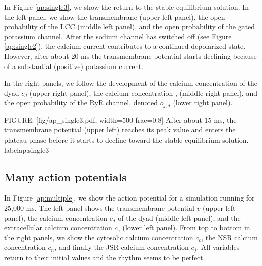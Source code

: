 In Figure \ref{ap:single3}, we show the return to the stable equilibrium solution. In the left panel, we show the transmembrane (upper left panel), the open probability of the LCC (middle left panel), and the open probability of the gated potassium channel. After the sodium channel has switched off (see Figure \ref{ap:single2}), the calcium current contributes to a continued depolarized state. However, after about 20 ms the transmembrane potential starts declining because of a substantial (positive) potassium current.

In the right panels, we follow the development of the calcium concentration of the dyad $c_d$ (upper right panel),  the calcium concentration
,
(middle right panel), and the open probability of the RyR channel, denoted $o_{j,d}$ (lower right panel).

FIGURE: [fig/ap_single3.pdf, width=500 frac=0.8] After about 15 ms, the transmembrane potential (upper left) reaches its peak value and enters the plateau phase before it starts to decline toward the stable equilibrium solution.  label{ap:single3}

\subsection{Many action potentials}

In Figure \ref{ap:multiple}, we show the action potential for a simulation running for 25,000 ms. The left panel shows the transmembrane potential $v$ (upper left panel), the calcium concentration $c_d$ of the dyad (middle left panel), and the extracellular calcium concentration $c_e$ (lower left panel). From top to bottom in the right panels, we show the cytosolic calcium concentration $c_c$, the NSR calcium concentration $c_n$, and finally the JSR calcium concentration $c_j$. All variables return to their initial values and the rhythm seems to be perfect.


